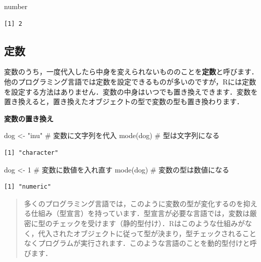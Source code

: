 \documentclass[
  letterpaper,
  DIV=11,
  numbers=noendperiod]{scrreprt}
\newenvironment{Shaded}{\begin{snugshade}}{\end{snugshade}}
\newcommand{\CommentTok}[1]{\textcolor[rgb]{0.37,0.37,0.37}{#1}}
\newcommand{\DecValTok}[1]{\textcolor[rgb]{0.68,0.00,0.00}{#1}}
\newcommand{\FunctionTok}[1]{\textcolor[rgb]{0.28,0.35,0.67}{#1}}
\newcommand{\NormalTok}[1]{\textcolor[rgb]{0.00,0.23,0.31}{#1}}
\newcommand{\OtherTok}[1]{\textcolor[rgb]{0.00,0.23,0.31}{#1}}
\newcommand{\StringTok}[1]{\textcolor[rgb]{0.13,0.47,0.30}{#1}}
\begin{document}
\begin{Shaded}
\begin{Highlighting}[]
\NormalTok{number}
\end{Highlighting}
\end{Shaded}

\begin{verbatim}
[1] 2
\end{verbatim}

\hypertarget{ux5b9aux6570}{%
\subsection{定数}\label{ux5b9aux6570}}

変数のうち，一度代入したら中身を変えられないもののことを\textbf{定数}と呼びます．他のプログラミング言語では定数を設定できるものが多いのですが，Rには定数を設定する方法はありません．変数の中身はいつでも置き換えできます．変数を置き換えると，置き換えたオブジェクトの型で変数の型も置き換わります．

\textbf{変数の置き換え}

\begin{Shaded}
\begin{Highlighting}[]
\NormalTok{dog }\OtherTok{\textless{}{-}} \StringTok{"inu"} \CommentTok{\# 変数に文字列を代入}
\FunctionTok{mode}\NormalTok{(dog) }\CommentTok{\# 型は文字列になる}
\end{Highlighting}
\end{Shaded}

\begin{verbatim}
[1] "character"
\end{verbatim}

\begin{Shaded}
\begin{Highlighting}[]
\NormalTok{dog }\OtherTok{\textless{}{-}} \DecValTok{1} \CommentTok{\# 変数に数値を入れ直す}
\FunctionTok{mode}\NormalTok{(dog) }\CommentTok{\# 変数の型は数値になる}
\end{Highlighting}
\end{Shaded}

\begin{verbatim}
[1] "numeric"
\end{verbatim}

\begin{quote}
多くのプログラミング言語では，このように変数の型が変化するのを抑える仕組み（型宣言）を持っています．型宣言が必要な言語では，変数は厳密に型のチェックを受けます（静的型付け）．Rはこのような仕組みがなく，代入されたオブジェクトに従って型が決まり，型チェックされることなくプログラムが実行されます．このような言語のことを動的型付けと呼びます．
\end{quote}
\end{document}
